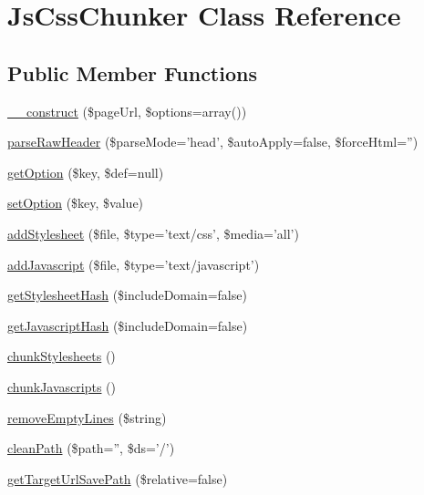 \hypertarget{class_js_css_chunker}{
\section{JsCssChunker Class Reference}
\label{class_js_css_chunker}
}
\subsection*{Public Member Functions}
\begin{DoxyCompactItemize}
\item 
\hyperlink{class_js_css_chunker_ac086f7147441cc8347f8a760eb770101}{\_\-\_\-construct} (\$pageUrl, \$options=array())
\item 
\hyperlink{class_js_css_chunker_ac32c20b2f951ab2438e316fe389e75f7}{parseRawHeader} (\$parseMode='head', \$autoApply=false, \$forceHtml='')
\item 
\hyperlink{class_js_css_chunker_acb96f17aa6285ea00daff20ca5f1c93c}{getOption} (\$key, \$def=null)
\item 
\hyperlink{class_js_css_chunker_a929e8f404dc73d92009451a5ed013002}{setOption} (\$key, \$value)
\item 
\hyperlink{class_js_css_chunker_aa9295fea2a4cdc642f94381f251c9f16}{addStylesheet} (\$file, \$type='text/css', \$media='all')
\item 
\hyperlink{class_js_css_chunker_a7c61cd4a535f6ef8a2ac604053bec5ca}{addJavascript} (\$file, \$type='text/javascript')
\item 
\hyperlink{class_js_css_chunker_a29604beec796d425a475bddb9ff82c5b}{getStylesheetHash} (\$includeDomain=false)
\item 
\hyperlink{class_js_css_chunker_ae81263b37e30c07c080446d676c88217}{getJavascriptHash} (\$includeDomain=false)
\item 
\hyperlink{class_js_css_chunker_ad63514de6e0414ed0bd104b40027ff8b}{chunkStylesheets} ()
\item 
\hyperlink{class_js_css_chunker_a14d41458a27cb28c3b7e0f46a55778ef}{chunkJavascripts} ()
\item 
\hyperlink{class_js_css_chunker_a976dec9e25715c7d8771c1ad4968d3fe}{removeEmptyLines} (\$string)
\item 
\hyperlink{class_js_css_chunker_a9a4e27841f563dbd1f8a77e583a2df1c}{cleanPath} (\$path='', \$ds='/')
\item 
\hyperlink{class_js_css_chunker_a701582531b3978f3ba661244b9a481db}{getTargetUrlSavePath} (\$relative=false)
\item 

\end{DoxyCompactItemize}
